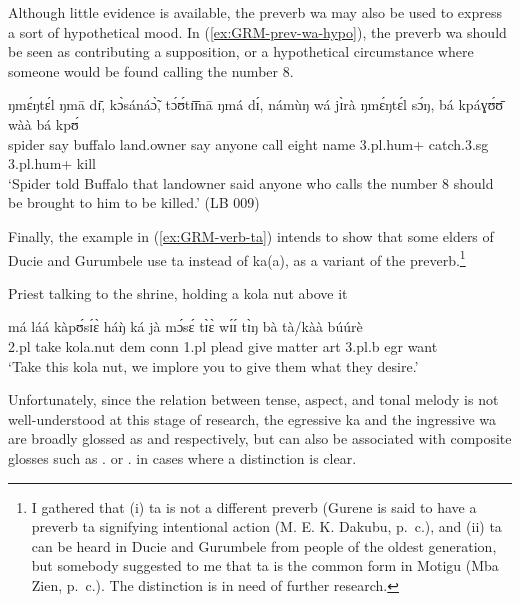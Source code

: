 \begin{exe}
\begin{exe}
\begin{exe}
{\begin{exe}
\begin{exe}
\begin{exe}
\begin{exe}
\begin{exe}
\begin{exe}
\begin{exe}
\begin{exe}
\begin{exe}
\begin{exe}
\begin{exe}
\begin{exe}
\begin{exe}
\begin{exe}
\begin{exe}
\begin{exe}
\begin{exe}
\begin{exe}
\begin{exe}
Although little evidence is available, the preverb {\sls wa} may also be used to
express a sort of hypothetical  mood.  In  (\ref{ex:GRM-prev-wa-hypo}), the
preverb {\sls wa} should be seen as contributing a supposition, or a 
hypothetical
circumstance where
someone would be found calling the number 8. 

\ea\label{ex:GRM-prev-wa-hypo}

\gll ŋmɛ́ŋtɛ́l   ŋmā dɪ̄, kɔ̀sánáɔ̃̀,   tɔ́ʊ́tɪ̄ɪ̄nā  ŋmá 
dɪ́, námùŋ   wá jɪ̀rà ŋmɛ́ŋtɛ́l sɔ́ŋ, bá  kpáɣʊ́ʊ̄ wàà 
bá kpʊ́\\
spider  say   {\comp}   buffalo land.owner say {\comp}  anyone   
{\ingr}   call eight  name {\sc 3.pl.hum+} catch.{\sc 3.sg} {\foc}
 {\sc 3.pl.hum+}  kill\\
\glt `Spider told Buffalo that landowner said anyone who calls the number 8
should be brought to him to be killed.' (LB 009)
\z



Finally, the example in (\ref{ex:GRM-verb-ta})  intends to show that some
elders of Ducie and
Gurumbele use  {\sls ta}  instead of {\sls ka(a)},  as a variant of the
preverb.\footnote{I gathered that  (i)   {\sls ta} is not a different
preverb (Gurene is said to have  a preverb {\sls ta}  signifying intentional
action  (M. E. K. Dakubu, p.\ c.),  and  (ii)   {\sls ta} can be heard in  
Ducie 
and
Gurumbele from people of the oldest generation, but somebody suggested to me
that {\sls ta} is the common form in Motigu (Mba Zien, p.\ c.).  The distinction
is  in need of further research. } 
 

\begin{exe}
   \ex\label{ex:GRM-verb-ta}{\rm Priest talking to the shrine, holding a kola
nut above it}

\gll  má láá kàpʊ́sɪ́ɛ̀ háŋ̀ ká jà mɔ́sɛ́ tɪ̀ɛ̀ wɪ́ɪ́ tɪ̀ŋ bà 
tà/kàà búúrè\\
{\sc 2.pl} take kola.nut {\sc dem} {\sc conn} {\sc 1.pl} plead give matter {\sc
art} {\sc 3.pl.}b {\sc  egr} want\\
\glt   `Take this kola nut, we implore  you to give them what they desire.'

\z


Unfortunately, since the relation between tense, aspect, and tonal melody is not
well-understood at this stage of research, the  egressive {\sls ka}   and the
ingressive  {\sls wa} are  broadly glossed as {\egr} and {\ingr} respectively, 
but
can also be associated with composite glosses such as {\ipfv .\fut} or  {\ipfv
.\pres}  in cases where a distinction is clear.





\end{exe}
\end{exe}
\end{exe}
\end{exe}
\end{exe}
\end{exe}
\end{exe}
\end{exe}
\end{exe}
\end{exe}
\end{exe}
\end{exe}
\end{exe}
\end{exe}
\end{exe}
\end{exe}
\end{exe}
\end{exe}
\end{exe}
\end{exe}}
\end{exe}
\end{exe}
\end{exe}
